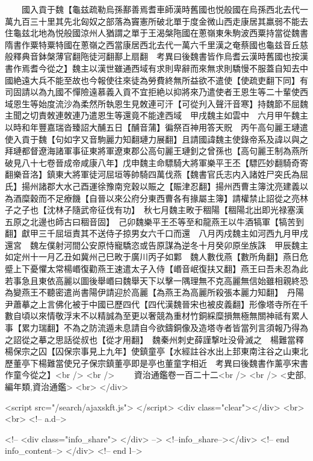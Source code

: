 　　國入貢于魏【龜兹疏勒烏孫鄯善焉耆車師漢時舊國也悦般國在烏孫西北去代一萬九百三十里其先北匈奴之部落為竇憲所破北單于度金微山西走康居其羸弱不能去住龜兹北地為悦般國涼州人猶謂之單于王渴槃陁國在蔥嶺東朱駒波西粟持當從魏書隋書作粟特粟特國在蔥嶺之西當康居西北去代一萬六千里漢之奄蔡國也龜兹音丘慈般釋典音鉢槃薄官翻陁徒河翻鄯上扇翻　考異曰後魏書皆作烏耆云漢時舊國也按漢書作焉耆今從之】魏主以漢世雖通西域有求則卑辭而來無求則驕慢不服蓋自知去中國絶遠大兵不能至故也今報使往來徒為勞費終無所益欲不遣使【使疏吏翻下同】有司固請以為九國不憚險遠慕義入貢不宜拒絶以抑將來乃遣使者王恩生等二十輩使西域恩生等始度流沙為柔然所執恩生見敇連可汗【可從刋入聲汗音寒】持魏節不屈魏主聞之切責敇連敇連乃遣恩生等還竟不能達西域　甲戌魏主如雲中　六月甲午魏主以時和年豐嘉瑞沓臻詔大酺五日【酺音蒲】徧祭百神用答天貺　丙午高句麗王璉遣使入貢于魏【句如字又音駒麗力知翻璉力展翻】且請國諱魏主使錄帝系及諱以與之拜璉都督遼海諸軍事征東將軍遼東郡公高句麗王璉釗之曾孫也【高句麗王制為燕所破見八十七卷晉成帝咸康八年】戊申魏主命驃騎大將軍樂平王丕【驃匹妙翻騎奇寄翻樂音洛】鎮東大將軍徒河屈垣等帥騎四萬伐燕【魏書官氏志内入諸姓尸突氏為屈氏】揚州諸郡大水己酉運徐豫南兖穀以賑之【賑津忍翻】揚州西曹主簿沈亮建義以為酒糜穀而不足療饑【自晉以來公府分東西曹各有掾屬主簿】請權禁止詔從之亮林子之子也【沈林子隨武帝征伐有功】　秋七月魏主畋于稒陽【稒陽北出即光禄塞漢五原之北邊也師古曰稒音固】　己卯魏樂平王丕等至和龍燕王以牛酒犒軍【犒苦到翻】獻甲三千屈垣責其不送侍子掠男女六千口而還　八月丙戍魏主如河西九月甲戌還宮　魏左僕射河間公安原恃寵驕恣或告原謀為逆冬十月癸卯原坐族誅　甲辰魏主如定州十一月乙丑如冀州己巳畋于廣川丙子如鄴　魏人數伐燕【數所角翻】燕日危蹙上下憂懼太常楊㟭復勸燕王速遣太子入侍【㟭音岷復扶又翻】燕王曰吾未忍為此若事急且東依高麗以圖後舉㟭曰魏舉天下以擊一隅理無不克高麗無信始雖相親終恐為變燕王不聽密遣尚書陽伊請迎於高麗【為燕王為高麗所殺張本麗力知翻】　丹陽尹蕭摹之上言佛化被于中國已歷四代【四代漢魏晉宋也被皮義翻】形像塔寺所在千數自頃以來情敬浮末不以精誠為至更以奢競為重材竹銅綵糜損無極無關神祗有累人事【累力瑞翻】不為之防流遁未息請自今欲鑄銅像及造塔寺者皆當列言須報乃得為之詔從之摹之思話從叔也【從才用翻】　魏秦州刺史薛謹撃吐没骨滅之　楊難當釋楊保宗之囚【囚保宗事見上九年】使鎮童亭【水經註谷水出上邽東南注谷之山東北歷董亭下楊難當使兄子保宗鎮董亭即是亭也董童字相近　考異曰後魏書作薰亭宋書作童今從之】<br />
<br />
　　資治通鑑卷一百二十二<br />
<br />
<史部,編年類,資治通鑑>  <br>
   </div> 

<script src="/search/ajaxskft.js"> </script>
 <div class="clear"></div>
<br>
<br>
 <!-- a.d-->

 <!--
<div class="info_share">
</div> 
-->
 <!--info_share--></div>   <!-- end info_content-->
  </div> <!-- end l-->

